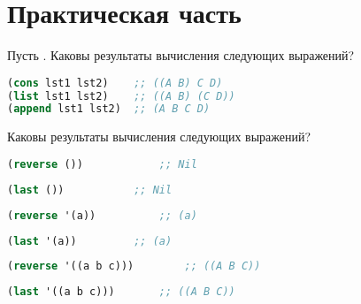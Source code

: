 \documentclass[a4paper,oneside,12pt]{extreport}
\begin{document}


\section*{Практическая часть}

\begin{task}
	Пусть .
	Каковы результаты вычисления следующих выражений?
	\begin{lstlisting}[language=Lisp]
(cons lst1 lst2) 	;; ((A B) C D)
(list lst1 lst2) 	;; ((A B) (C D))
(append lst1 lst2) 	;; (A B C D)
	\end{lstlisting}


\end{task}

\begin{task}
	Каковы результаты вычисления следующих выражений?

	\begin{lstlisting}[language=Lisp]
(reverse ())			;; Nil
	\end{lstlisting}

	\begin{lstlisting}[language=Lisp]
(last ())			;; Nil
	\end{lstlisting}

	\begin{lstlisting}[language=Lisp]
(reverse '(a))			;; (a)
	\end{lstlisting}

	\vspace*{4.5em plus .6em minus .5em}

	\begin{lstlisting}[language=Lisp]
(last '(a))			;; (a)
	\end{lstlisting}

	\begin{lstlisting}[language=Lisp]
(reverse '((a b c)))		;; ((A B C))
	\end{lstlisting}

	\vspace*{4.5em plus .6em minus .5em}

	\begin{lstlisting}[language=Lisp]
(last '((a b c)))		;; ((A B C))
	\end{lstlisting}


\end{task}
\end{document}
